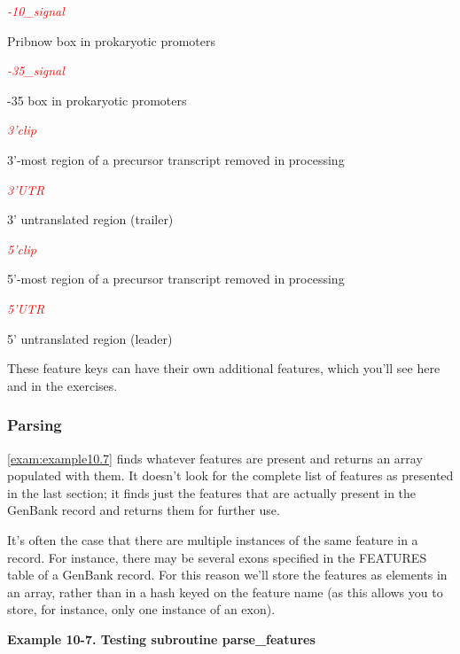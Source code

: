 \textcolor{red}{\textit{-10\_signal}}
\begin{adjustwidth}{1cm}{}
Pribnow box in prokaryotic promoters
\end{adjustwidth}

\textcolor{red}{\textit{-35\_signal}}
\begin{adjustwidth}{1cm}{}
-35 box in prokaryotic promoters
\end{adjustwidth}

\textcolor{red}{\textit{3'clip}}
\begin{adjustwidth}{1cm}{}
3'-most region of a precursor transcript removed in processing
\end{adjustwidth}

\textcolor{red}{\textit{3'UTR}}
\begin{adjustwidth}{1cm}{}
3' untranslated region (trailer)
\end{adjustwidth}

\textcolor{red}{\textit{5'clip}}
\begin{adjustwidth}{1cm}{}
5'-most region of a precursor transcript removed in processing
\end{adjustwidth}

\textcolor{red}{\textit{5'UTR}}
\begin{adjustwidth}{1cm}{}
5' untranslated region (leader)
\end{adjustwidth}

These feature keys can have their own additional features, which you'll see here and in the exercises. 

\subsubsection{Parsing}
\autoref{exam:example10.7} finds whatever features are present and returns an array populated with them. It doesn't look for the complete list of features as presented in the last section; it finds just the features that are actually present in the GenBank record and returns them for further use.

It's often the case that there are multiple instances of the same feature in a record. For instance, there may be several exons specified in the FEATURES table of a GenBank record. For this reason we'll store the features as elements in an array, rather than in a hash keyed on the feature name (as this allows you to store, for instance, only one instance of an exon).

\textbf{Example 10-7. Testing subroutine parse\_features}


